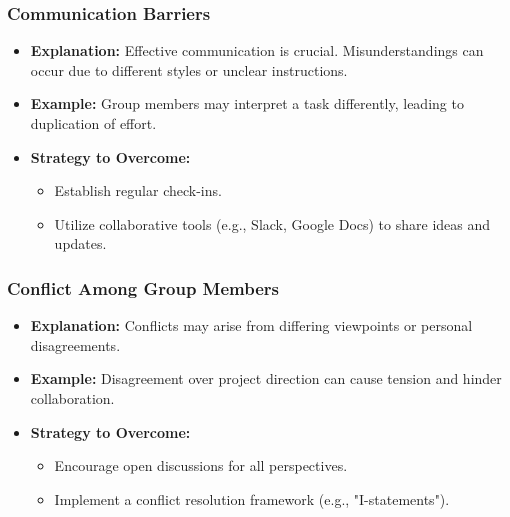 \documentclass{beamer}
\begin{document}
\begin{frame}[fragile]
    \frametitle{Communication Barriers}
    \begin{itemize}
        \item \textbf{Explanation:} Effective communication is crucial. Misunderstandings can occur due to different styles or unclear instructions.
        \item \textbf{Example:} Group members may interpret a task differently, leading to duplication of effort.
        \item \textbf{Strategy to Overcome:}
        \begin{itemize}
            \item Establish regular check-ins.
            \item Utilize collaborative tools (e.g., Slack, Google Docs) to share ideas and updates.
        \end{itemize}
    \end{itemize}
\end{frame}

\begin{frame}[fragile]
    \frametitle{Conflict Among Group Members}
    \begin{itemize}
        \item \textbf{Explanation:} Conflicts may arise from differing viewpoints or personal disagreements.
        \item \textbf{Example:} Disagreement over project direction can cause tension and hinder collaboration.
        \item \textbf{Strategy to Overcome:}
        \begin{itemize}
            \item Encourage open discussions for all perspectives.
            \item Implement a conflict resolution framework (e.g., "I-statements").
        \end{itemize}
    \end{itemize}
\end{frame}
\end{document}
